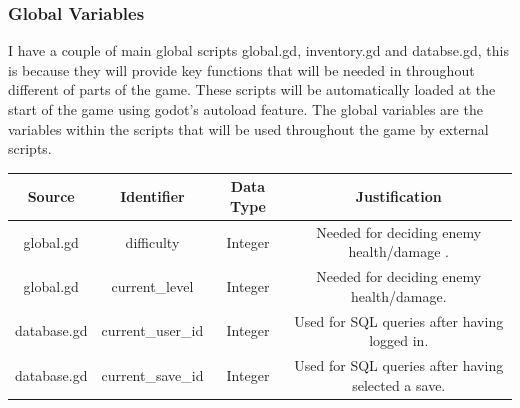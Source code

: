 \documentclass{article}
\begin{document}
        \subsubsection{Global Variables}
        I have a couple of main global scripts global.gd, inventory.gd and databse.gd, this is because they will provide key functions that will be needed in throughout different of parts of the game. These scripts will be automatically loaded at the start of the game using godot's autoload feature. The global variables are the variables within the scripts that will be used throughout the game by external scripts.\\
        \begin{tabular}{|c|c|c|c|}
                \hline
                Source&Identifier&Data Type&Justification\\
                \hline
                global.gd&difficulty&Integer&Needed for deciding enemy health/damage .\\
                \hline
                global.gd&current\_level&Integer&Needed for deciding enemy health/damage.\\
                \hline
                database.gd&current\_user\_id&Integer&Used for SQL queries after having logged in.\\
                \hline
                database.gd&current\_save\_id&Integer&Used for SQL queries after having selected a save.\\
                \hline
        \end{tabular}
\end{document}

